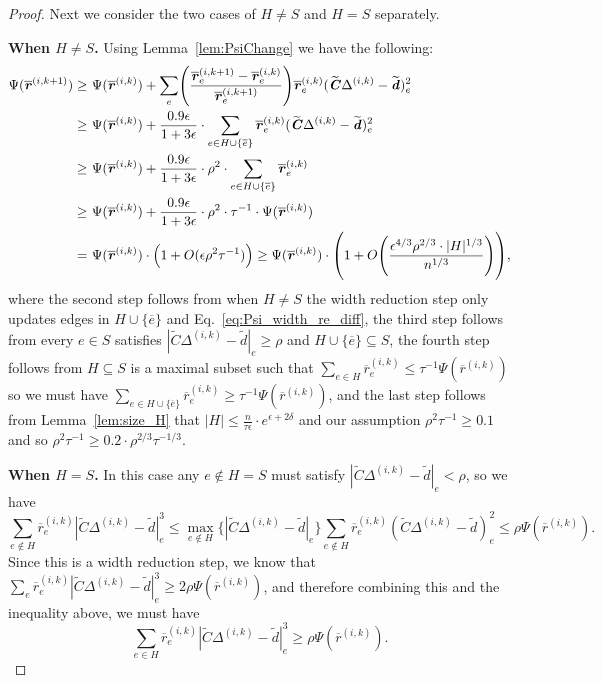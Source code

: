 \documentclass[11pt]{article}
\let\originalleft\left
\let\originalright\right
\renewcommand{\left}{\mathopen{}\mathclose\bgroup\originalleft}
\renewcommand{\right}{\aftergroup\egroup\originalright}
\newcommand\dd{\boldsymbol{\mathit{d}}}
\newcommand\rr{\boldsymbol{\mathit{r}}}
\newcommand\rrbar{\overline{\boldsymbol{\mathit{r}}}}
\newcommand\CC{\boldsymbol{\mathit{C}}}
\newcommand{\wt}{\widetilde}
\newcommand{\ov}{\overline}
\begin{document}
\begin{proof}
Next we consider the two cases of $H \neq S$ and $H = S$ separately.

{\bf When $H\neq S$.} Using Lemma~\ref{lem:PsiChange} we have the following: 
\begin{align*}
\Psi(\ov{\rr}^{(i,k+1)}) \geq &~ \Psi(\ov{\rr}^{(i,k)})+ \sum_e \left(\frac{\ov{\rr}^{(i,k+1)}_e-\ov{\rr}^{(i,k)}_e}{\ov{\rr}^{(i,k+1)}_e}\right)\ov{\rr}^{(i,k)}_e (\wt{\CC} \Delta^{(i,k)}-\wt{\dd})_e^2 \\
\geq &~ \Psi(\ov{\rr}^{(i,k)}) + \frac{0.9 \epsilon}{1 + 3 \epsilon} \cdot \sum_{e \in H \cup \{\ov{e}\}} \ov{\rr}^{(i,k)}_e (\wt{\CC} \Delta^{(i,k)}-\wt{\dd})_e^2 \\
\geq &~ \Psi(\ov{\rr}^{(i,k)}) + \frac{0.9 \epsilon}{1 + 3 \epsilon} \cdot \rho^2 \cdot \sum_{e \in H \cup \{\ov{e}\}} \ov{\rr}^{(i,k)}_e \\
\geq &~ \Psi(\ov{\rr}^{(i,k)}) + \frac{0.9 \epsilon}{1 + 3 \epsilon} \cdot \rho^2 \cdot \tau^{-1} \cdot \Psi(\rrbar^{(i,k)}) \\
= &~ \Psi(\ov{\rr}^{(i,k)}) \cdot \left( 1 + O(\epsilon \rho^{2} \tau^{-1})\right)
\geq \Psi(\ov{\rr}^{(i,k)}) \cdot \left( 1 + O\left( \frac{\epsilon^{4/3} \rho^{2/3} \cdot |H|^{1/3}}{n^{1/3}} \right) \right),
\end{align*}
where the second step follows from when $H \neq S$ the width reduction step only updates edges in $H \cup \{\ov{e}\}$ and Eq.~\eqref{eq:Psi_width_re_diff}, the third step follows from every $e \in S$ satisfies $|\wt{\CC}\Delta^{(i,k)}-\wt{\dd}|_{e}\geq \rho$ and $H \cup \{\ov{e}\} \subseteq S$, the fourth step follows from $H \subseteq S$ is a maximal subset such that $\sum_{e\in H}\rrbar_e^{(i,k)}\leq \tau^{-1}\Psi(\rrbar^{(i,k)})$ so we must have $\sum_{e\in H \cup \{\ov{e}\}}\rrbar_e^{(i,k)}\geq \tau^{-1}\Psi(\rrbar^{(i,k)})$, and the last step follows from Lemma~\ref{lem:size_H} that $|H| \leq \frac{n}{\tau \epsilon} \cdot e^{\epsilon + 2 \delta}$ and our assumption $\rho^2 \tau^{-1} \geq 0.1$ and so $\rho^2 \tau^{-1} \geq 0.2 \cdot \rho^{2/3} \tau^{-1/3}$.




{\bf When $H = S$.} In this case any $e \notin H = S$ must satisfy $|\wt{\CC}\Delta^{(i,k)}-\wt{\dd}|_e < \rho$, so we have
\[
\sum_{e \notin H}\ov{\rr}^{(i,k)}_e|\wt{\CC}\Delta^{(i,k)}-\wt{\dd}|_e^3 \leq \max_{e\notin H}\{|\wt{\CC}\Delta^{(i,k)}-\wt{\dd}|_e\}\sum_{e \notin H}\ov{\rr}^{(i,k)}_e (\wt{\CC}\Delta^{(i,k)}-\wt{\dd})_e^2 \leq \rho\Psi(\ov{\rr}^{(i,k)}).
\]
Since this is a width reduction step, we know that $\sum_{e }\ov{\rr}^{(i,k)}_e|\wt{\CC}\Delta^{(i,k)}-\wt{\dd}|_e^3 \geq 2\rho\Psi(\ov{\rr}^{(i,k)})$, and therefore combining this and the inequality above, we must have
\[
\sum_{e\in H }\ov{\rr}^{(i,k)}_e|\wt{\CC}\Delta^{(i,k)}-\wt{\dd}|_e^3 \geq \rho\Psi(\ov{\rr}^{(i,k)}).
\]


\end{proof}
\end{document}
